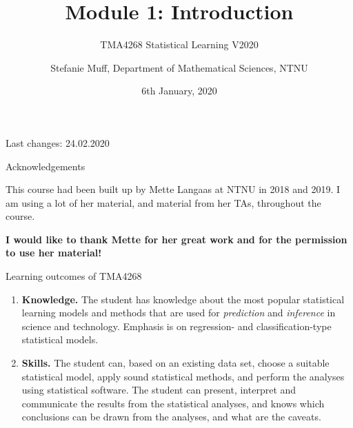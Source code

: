 \documentclass[10pt,ignorenonframetext,]{beamer}
\title{Module 1: Introduction}
\subtitle{TMA4268 Statistical Learning V2020}
\author{Stefanie Muff, Department of Mathematical Sciences, NTNU}
\date{6th January, 2020}
\begin{document}
\frame{\titlepage}

\begin{frame}

Last changes: 24.02.2020

\end{frame}

\begin{frame}{Acknowledgements}

This course had been built up by Mette Langaas at NTNU in 2018 and 2019.
I am using a lot of her material, and material from her TAs, throughout
the course.

\textbf{I would like to thank Mette for her great work and for the
permission to use her material!}

\end{frame}

\begin{frame}{Learning outcomes of TMA4268}

\begin{enumerate}
\def\labelenumi{\arabic{enumi}.}
\item
  \textbf{Knowledge.} The student has knowledge about the most popular
  statistical learning models and methods that are used for
  \emph{prediction} and \emph{inference} in science and technology.
  Emphasis is on regression- and classification-type statistical models.
\item
  \textbf{Skills.} The student can, based on an existing data set,
  choose a suitable statistical model, apply sound statistical methods,
  and perform the analyses using statistical software. The student can
  present, interpret and communicate the results from the statistical
  analyses, and knows which conclusions can be drawn from the analyses,
  and what are the caveats.
\end{enumerate}

\end{frame}
\end{document}
